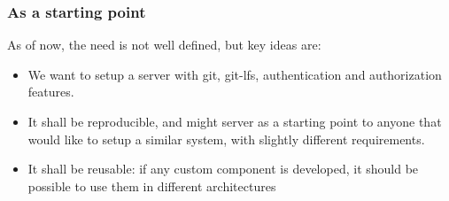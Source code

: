 \subsubsection{As a starting point}

As of now, the need is not well defined, but key ideas are: 

\begin{itemize}
    \item We want to setup a server with git, git-lfs, authentication and authorization features. 
    \item It shall be reproducible, and might server as a starting point to anyone that would like to setup a similar system, with slightly different requirements. 
    \item It shall be reusable: if any custom component is developed, it should be possible to use them in different architectures
\end{itemize}
